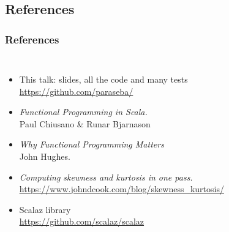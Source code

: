 \documentclass{beamer}
\begin{document}
\subsection{References}
\begin{frame}
  \frametitle{References}
  \begin{columns}[c]
      \begin{itemize}

        \item This talk: slides, all the \alert{code and many tests} \\
          \href{https://github.com/paraseba/}{\underline{https://github.com/paraseba/}} %

        \item \textit{Functional Programming in Scala.}\\ Paul Chiusano \& Runar Bjarnason

        \item \textit{Why Functional Programming Matters} \\
          John Hughes.

        \item \textit{Computing skewness and kurtosis in one pass.} \\
          {\footnotesize \href{https://www.johndcook.com/blog/skewness\_kurtosis/}{\underline{https://www.johndcook.com/blog/skewness\_kurtosis/}}}

        \item Scalaz library \\
          {\href{https://github.com/scalaz/scalaz}{\underline{https://github.com/scalaz/scalaz}}}
      \end{itemize}



\end{columns}
\end{frame}
\end{document}
